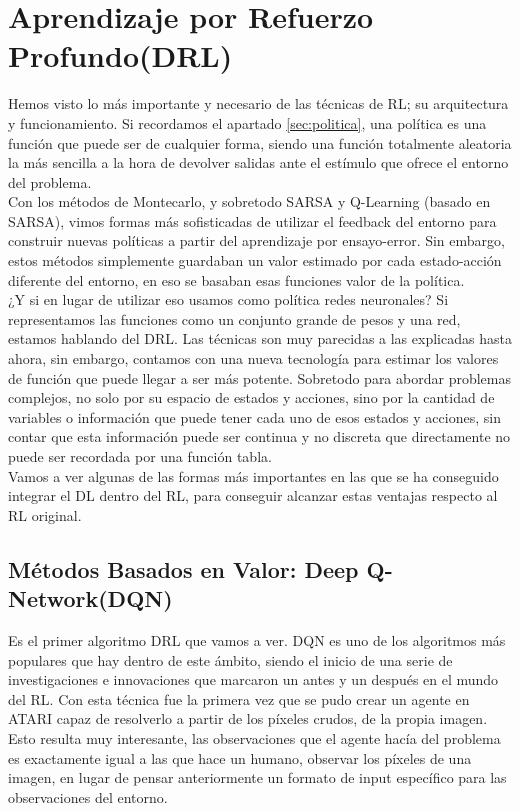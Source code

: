 \documentclass[11pt,fleqn]{book} %
\begin{document}
\chapter{Aprendizaje por Refuerzo Profundo(DRL)}

Hemos visto lo más importante y necesario de las técnicas de RL; su arquitectura y funcionamiento. Si recordamos el apartado \ref{sec:politica}, una política es una función que puede ser de cualquier forma, siendo una función totalmente aleatoria la más sencilla a la hora de devolver salidas ante el estímulo que ofrece el entorno del problema. \\

Con los métodos de Montecarlo, y sobretodo SARSA y Q-Learning (basado en SARSA), vimos formas más sofisticadas de utilizar el feedback del entorno para construir nuevas políticas a partir del aprendizaje por ensayo-error. Sin embargo, estos métodos simplemente guardaban un valor estimado por cada estado-acción diferente del entorno, en eso se basaban esas funciones valor de la política. \\

¿Y si en lugar de utilizar eso usamos como política redes neuronales? Si representamos las funciones como un conjunto grande de pesos y una red, estamos hablando del DRL. Las técnicas son muy parecidas a las explicadas hasta ahora, sin embargo, contamos con una nueva tecnología para estimar los valores de función que puede llegar a ser más potente. Sobretodo para abordar problemas complejos, no solo por su espacio de estados y acciones, sino por la cantidad de variables o información que puede tener cada uno de esos estados y acciones, sin contar que esta información puede ser continua y no discreta que directamente no puede ser recordada por una función tabla. \\

Vamos a ver algunas de las formas más importantes en las que se ha conseguido integrar el DL dentro del RL, para conseguir alcanzar estas ventajas respecto al RL original.

\section{Métodos Basados en Valor: Deep Q-Network(DQN)}\label{sec:DQN}

Es el primer algoritmo DRL que vamos a ver. DQN es uno de los algoritmos más populares que hay dentro de este ámbito, siendo el inicio de una serie de investigaciones e innovaciones que marcaron un antes y un después en el mundo del RL. Con esta técnica fue la primera vez que se pudo crear un agente en ATARI capaz de resolverlo a partir de los píxeles crudos, de la propia imagen. Esto resulta muy interesante, las observaciones que el agente hacía del problema es exactamente igual a las que hace un humano, observar los píxeles de una imagen, en lugar de pensar anteriormente un formato de input específico para las observaciones del entorno. \\
\end{document}
